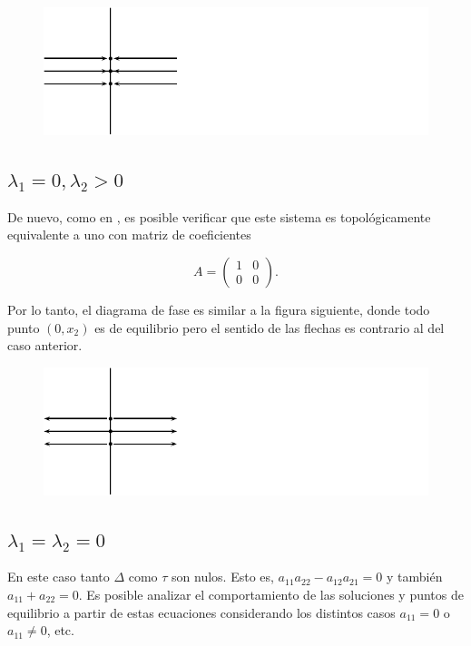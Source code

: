 \begin{figure}[!ht] \centering
    \includegraphics[scale=1.0]{figures/asingular_1.pdf}
\end{figure}

\subsection{$\lambda_1 = 0, \lambda_2 > 0$}
De nuevo, como en \cite[p.~239]{dynandbif}, es posible verificar que este sistema es topológicamente equivalente a uno con matriz de coeficientes

$$ A = \left( \begin{array}{ll} 1 & 0 \\ 0 & 0 \end{array} \right).$$

Por lo tanto, el diagrama de fase es similar a la figura siguiente, donde todo punto $(0,x_2)$ es de equilibrio pero el sentido de las flechas es contrario al del caso anterior.

\begin{figure}[!ht] \centering
    \includegraphics[scale=1.0]{figures/asingular1.pdf}
\end{figure}

\subsection{$\lambda_1 = \lambda_2 = 0$}
En este caso tanto $\Delta$ como $\tau$ son nulos. Esto es, $a_{11}a_{22} - a_{12}a_{21} = 0$ y también $a_{11} + a_{22} = 0$.
Es posible analizar el comportamiento de las soluciones y puntos de equilibrio a partir de estas ecuaciones considerando los distintos casos $a_{11} = 0$ o $a_{11} \neq 0$, etc.

